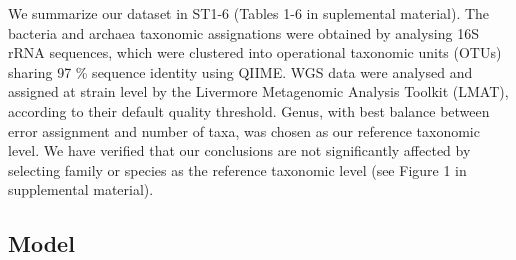We summarize our dataset in ST1-6 (Tables 1-6 in suplemental material). The bacteria and archaea taxonomic assignations were obtained by analysing 16S rRNA sequences, which were clustered into operational taxonomic units (OTUs) sharing 97 \% sequence identity using QIIME\cite{QIIME}. WGS data\cite{kwashiorkor} were analysed and assigned at strain level by the Livermore Metagenomic Analysis Toolkit (LMAT)\cite{LMAT}, according to their default quality threshold. Genus, with best balance between error assignment and number of taxa, was chosen as our reference taxonomic level. We have verified that our conclusions are not significantly affected by selecting family or species as the reference taxonomic level (see Figure 1 in supplemental material).


\subsection*{Model} \label{sec:model}

